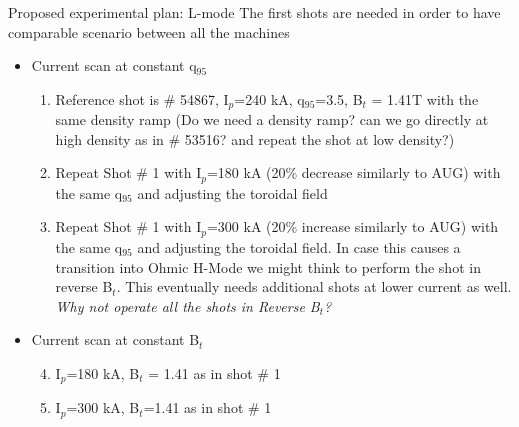 \documentclass[10pt, compress]{beamer}
\newcommand\Fontvi{\fontsize{8}{7.2}\selectfont}
\begin{document}
\begin{frame}{Proposed experimental plan: L-mode}
  \Fontvi
  The first shots are needed in order to have comparable scenario
  between all the machines
  \begin{itemize}
    \item Current scan at constant q$_{95}$
      \begin{enumerate}
      \item Reference shot is \# 54867, I$_p$=240 kA, q$_{95}$=3.5,
        B$_t$ = 1.41T with the same density ramp (\alert{Do we need a density ramp? can we
          go directly at high density as in \# 53516? and repeat the
          shot at low density?})
      \item Repeat Shot \# 1 with I$_p$=180 kA (20\% decrease similarly
        to AUG) with the same q$_{95}$ and adjusting the toroidal field
      \item Repeat Shot \# 1 with I$_p$=300 kA (20\% increase similarly
        to AUG) with the same q$_{95}$ and adjusting the toroidal
        field. \alert{In case this causes a transition into Ohmic H-Mode we
        might think to perform the shot in reverse B$_t$. This
        eventually needs additional shots at lower current as
        well. \emph{Why not operate all the shots in Reverse B$_t$?}}
      \end{enumerate}
    \item Current scan at constant B$_t$
      \begin{enumerate}
        \setcounter{enumi}{3}
      \item I$_p$=180 kA,  B$_t$ = 1.41 as in shot \# 1 
      \item I$_p$=300 kA, B$_t$=1.41 as in shot \# 1
      \end{enumerate}
    \end{itemize}      
  \end{frame}
\end{document}
